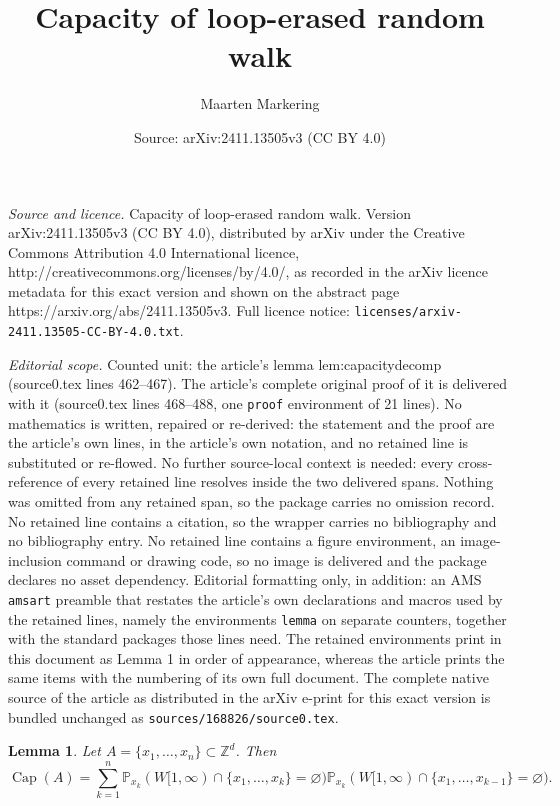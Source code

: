 \documentclass[10pt,a4paper]{amsart}
\title{Capacity of loop-erased random walk}
\author{Maarten Markering}
\date{Source: arXiv:2411.13505v3 (CC BY 4.0)}
\newtheorem{lemma}{Lemma}
\DeclareMathOperator{\Ca}{Cap}
\renewcommand{\P}{\mathbb{P}}
\newcommand{\Z}{\mathbb{Z}}
\begin{document}
\maketitle

\noindent\emph{Source and licence.} Capacity of loop-erased random walk. Version arXiv:2411.13505v3 (CC BY 4.0), distributed by arXiv under the Creative Commons Attribution 4.0 International licence, http://creativecommons.org/licenses/by/4.0/, as recorded in the arXiv licence metadata for this exact version and shown on the abstract page https://arxiv.org/abs/2411.13505v3. Full licence notice: \texttt{licenses/arxiv-2411.13505-CC-BY-4.0.txt}.\par\smallskip

\noindent\textit{Editorial scope.} Counted unit: the article's lemma lem:capacitydecomp (source0.tex lines 462--467). The article's complete original proof of it is delivered with it (source0.tex lines 468--488, one \texttt{proof} environment of 21 lines). No mathematics is written, repaired or re-derived: the statement and the proof are the article's own lines, in the article's own notation, and no retained line is substituted or re-flowed.  No further source-local context is needed: every cross-reference of every retained line resolves inside the two delivered spans.  Nothing was omitted from any retained span, so the package carries no omission record.  No retained line contains a citation, so the wrapper carries no bibliography and no bibliography entry.  No retained line contains a figure environment, an image-inclusion command or drawing code, so no image is delivered and the package declares no asset dependency.  Editorial formatting only, in addition: an AMS \texttt{amsart} preamble that restates the article's own declarations and macros used by the retained lines, namely the environments \texttt{lemma} on separate counters, together with the standard packages those lines need.  The retained environments print in this document as Lemma 1 in order of appearance, whereas the article prints the same items with the numbering of its own full document.  The complete native source of the article as distributed in the arXiv e-print for this exact version is bundled unchanged as \texttt{sources/168826/source0.tex}.
\begin{lemma}\label{lem:capacitydecomp}
Let $A=\{x_1,\ldots,x_n\}\subset\Z^d$. Then
\begin{equation}
    \Ca(A)=\sum_{k=1}^n\P_{x_k}(W[1,\infty)\cap\{x_1,\ldots,x_k\}=\varnothing)\P_{x_k}(W[1,\infty)\cap\{x_1,\ldots,x_{k-1}\}=\varnothing).
\end{equation}
\end{lemma}
\end{document}
